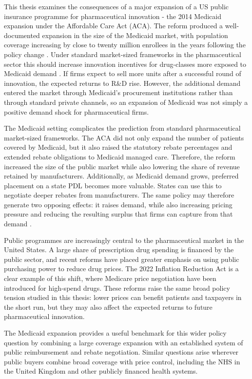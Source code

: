 \documentclass[12pt]{article}
\begin{document}
This thesis examines the consequences of a major expansion of a US public insurance programme for pharmaceutical innovation - the 2014 Medicaid expansion under the Affordable Care Act (ACA). The reform produced a well-documented expansion in the size of the Medicaid market, with population coverage increasing by close to twenty million enrollees in the years following the policy change \citep{kff2026medicaidexpansion}. Under standard market-sized frameworks in the pharmaceutical sector this should increase innovation incentives for drug-classes more exposed to Medicaid demand \citep{finkelstein2004static, dubois2015market}. If firms expect to sell more units after a successful round of innovation, the expected returns to R\&D rise. However, the additional demand entered the market through Medicaid's procurement institutions rather than through standard private channels, so an expansion of Medicaid was not simply a positive demand shock for pharmaceutical firms.

The Medicaid setting complicates the prediction from standard pharmaceutical market-sized frameworks. The ACA did not only expand the number of patients covered by Medicaid, but it also raised the statutory rebate percentages and extended rebate obligations to Medicaid managed care. Therefore, the reform increased the size of the public market while also lowering the share of revenue retained by manufacturers. Additionally, as Medicaid demand grows, preferred placement on a state PDL becomes more valuable. States can use this to negotiate deeper rebates from manufacturers. The same policy may therefore generate two opposing effects: it raises demand, while also increasing pricing pressure and reducing the resulting surplus that firms can capture from that demand \citep{duggan2006distortionary, feng2023profiting, garthwaite2023drug}.

Public programmes are increasingly central to the pharmaceutical market in the United States. A large share of prescription drug spending is financed by the public sector, and recent reforms have placed greater emphasis on using public purchasing power to reduce drug prices. The 2022 Inflation Reduction Act is a clear example of this shift, where Medicare price negotiation have been introduced for high-spend drugs. These reforms raise the same broad policy tension studied in this thesis: lower prices can benefit patients and taxpayers in the short run, but they may also affect the expected returns to future pharmaceutical innovation.

The Medicaid expansion provides a useful benchmark for this wider policy question by combining a large coverage expansion with an established system of public reimbursement and rebate negotiation. Similar questions arise wherever public buyers combine broad coverage with price control, including the NHS in the United Kingdom and other publicly financed health systems.
\end{document}
